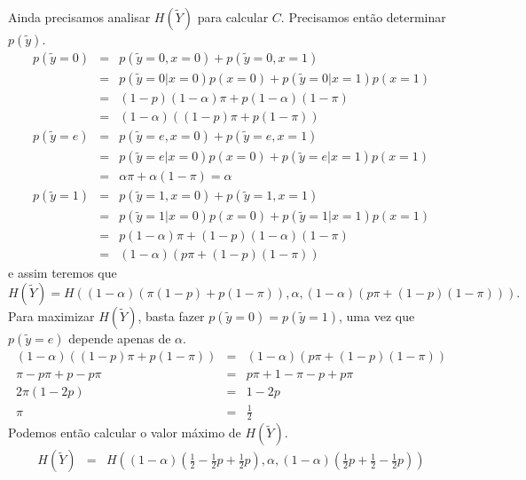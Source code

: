 \begin{questions}
\begin{solution}
Ainda precisamos analisar $H(\tilde{Y})$ para calcular $C$. Precisamos então determinar $p(\tilde{y})$.
\begin{eqnarray}
p(\tilde{y} = 0) &=& p(\tilde{y} = 0, x = 0) + p(\tilde{y} = 0, x = 1) \nonumber \\
        &=& p(\tilde{y} = 0 | x = 0) p(x = 0) + p(\tilde{y} = 0 | x = 1) p(x = 1) \nonumber \\
        &=& (1-p)(1-\alpha) \pi + p(1-\alpha)(1-\pi) \nonumber \\
        &=& (1-\alpha) \left( (1-p)\pi + p(1-\pi) \right) \\
p(\tilde{y} = e) &=& p(\tilde{y} = e, x = 0) + p(\tilde{y} = e, x = 1) \nonumber \\
        &=& p(\tilde{y} = e | x = 0) p(x = 0) + p(\tilde{y} = e | x = 1) p(x = 1) \nonumber \\
        &=& \alpha \pi + \alpha (1 - \pi) = \alpha \\
p(\tilde{y} = 1) &=& p(\tilde{y} = 1, x = 0) + p(\tilde{y} = 1, x = 1) \nonumber \\
        &=& p(\tilde{y} = 1 | x = 0) p(x = 0) + p(\tilde{y} = 1 | x = 1) p(x = 1) \nonumber \\
        &=& p(1-\alpha) \pi + (1-p)(1-\alpha)(1-\pi) \nonumber \\
        &=& (1-\alpha) \left( p\pi + (1-p)(1-\pi) \right)
\end{eqnarray}
e assim teremos que 
\begin{equation}
H(\tilde{Y}) = H\left( (1-\alpha)(\pi(1-p)+p(1-\pi)), \alpha , (1-\alpha)(p\pi + (1-p)(1-\pi) ) \right) .
\end{equation}
Para maximizar $H(\tilde{Y})$, basta fazer $p(\tilde{y} = 0) = p(\tilde{y} = 1)$, uma vez que 
$p(\tilde{y} = e)$ depende apenas de $\alpha$.
\begin{eqnarray}
(1-\alpha) \left( (1-p)\pi + p(1-\pi) \right) &=& (1-\alpha) \left( p\pi + (1-p)(1-\pi) \right) \nonumber \\
\pi -p\pi + p - p\pi &=& p\pi + 1 - \pi - p + p\pi \nonumber \\
2\pi (1 - 2p) &=& 1 - 2p \nonumber \\
\pi &=& \frac{1}{2}
\end{eqnarray}
Podemos então calcular o valor máximo de $H(\tilde{Y})$.
\begin{eqnarray}
H(\tilde{Y}) &=& H\left( (1 - \alpha)(\frac{1}{2} - \frac{1}{2}p + \frac{1}{2}p) , \alpha , (1 - \alpha)(\frac{1}{2}p + \frac{1}{2} - \frac{1}{2}p ) \right) \nonumber \\

\end{eqnarray}
\end{solution}
\end{questions}
